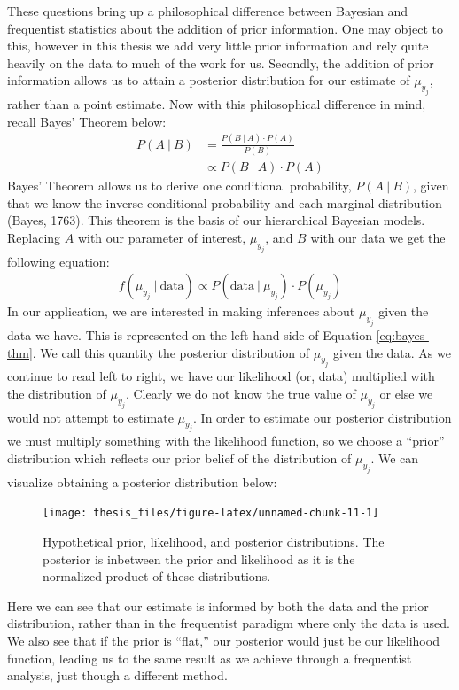 \documentclass[12pt,twoside]{reedthesis}
\begin{document}
These questions bring up a philosophical difference between Bayesian and frequentist statistics about the addition of prior information. One may object to this, however in this thesis we add very little prior information and rely quite heavily on the data to much of the work for us. Secondly, the addition of prior information allows us to attain a posterior distribution for our estimate of \(\mu_{y_j}\), rather than a point estimate. Now with this philosophical difference in mind, recall Bayes' Theorem below:
\begin{align}
P(A ~\vert~ B) &= \frac{P(B ~\vert~ A) \cdot P(A)}{P(B)} \\
&\propto P(B ~\vert~ A) \cdot P(A)
\end{align}
Bayes' Theorem allows us to derive one conditional probability, \(P(A ~\vert~ B)\), given that we know the inverse conditional probability and each marginal distribution (Bayes, 1763). This theorem is the basis of our hierarchical Bayesian models. Replacing \(A\) with our parameter of interest, \(\mu_{y_j}\), and \(B\) with our data we get the following equation:
\begin{align}
f(\mu_{y_j} ~\vert~ \text{data}) \propto P(\text{data} ~\vert~ \mu_{y_j}) \cdot P(\mu_{y_j})
\label{eq:bayes-thm}
\end{align}
In our application, we are interested in making inferences about \(\mu_{y_j}\) given the data we have. This is represented on the left hand side of Equation \eqref{eq:bayes-thm}. We call this quantity the posterior distribution of \(\mu_{y_j}\) given the data. As we continue to read left to right, we have our likelihood (or, data) multiplied with the distribution of \(\mu_{y_j}\). Clearly we do not know the true value of \(\mu_{y_j}\) or else we would not attempt to estimate \(\mu_{y_j}\). In order to estimate our posterior distribution we must multiply something with the likelihood function, so we choose a ``prior'' distribution which reflects our prior belief of the distribution of \(\mu_{y_j}\). We can visualize obtaining a posterior distribution below:
\begin{figure}
\texttt{[image: thesis\_files/figure-latex/unnamed-chunk-11-1]} \caption[Prior, likelihood, and posterior distributions.]{Hypothetical prior, likelihood, and posterior distributions. The posterior is inbetween the prior and likelihood as it is the normalized product of these distributions.}\label{fig:unnamed-chunk-11}
\end{figure}
Here we can see that our estimate is informed by both the data and the prior distribution, rather than in the frequentist paradigm where only the data is used. We also see that if the prior is ``flat,'' our posterior would just be our likelihood function, leading us to the same result as we achieve through a frequentist analysis, just though a different method.
\end{document}
